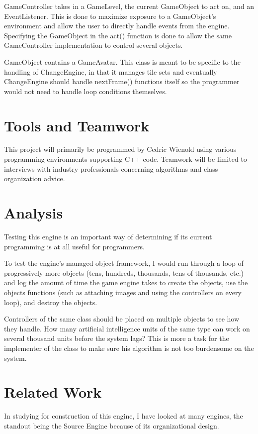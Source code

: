 \documentclass[12pt]{article}
\begin{document}
GameController takes in a GameLevel, the current GameObject to act on, and an EventListener. This is done to maximize exposure to a GameObject's environment and allow the user to directly handle events from the engine. Specifying the GameObject in the act() function is done to allow the same GameController implementation to control several objects.

GameObject contains a GameAvatar. This class is meant to be specific to the handling of ChangeEngine, in that it manages tile sets and eventually ChangeEngine should handle nextFrame() functions itself so the programmer would not need to handle loop conditions themselves.


  \section{Tools and Teamwork}
    This project will primarily be programmed by Cedric Wienold using various programming environments supporting C++ code. Teamwork will be limited to interviews with industry professionals concerning algorithms and class organization advice.

  \section{Analysis}
    Testing this engine is an important way of determining if its current programming is at all useful for programmers.

    To test the engine's managed object framework, I would run through a loop of progressively more objects (tens, hundreds, thousands, tens of thousands, etc.) and log the amount of time the game engine takes to create the objects, use the objects functions (such as attaching images and using the controllers on every loop), and destroy the objects.

    Controllers of the same class should be placed on multiple objects to see how they handle. How many artificial intelligence units of the same type can work on several thousand units before the system lags? This is more a task for the implementer of the class to make sure his algorithm is not too burdensome on the system.

  \section{Related Work}

In studying for construction of this engine, I have looked at many engines, the standout being the Source Engine because of its organizational design.
\end{document}
